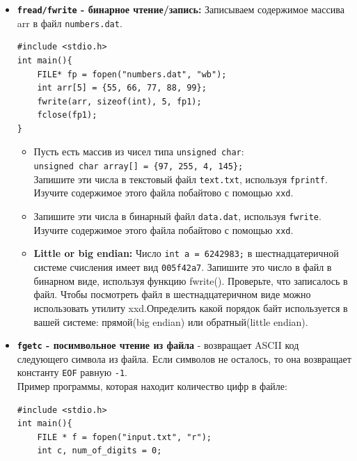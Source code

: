 \documentclass{article}
\begin{document}
\begin{itemize}
\item \textbf{\texttt{fread/fwrite} - бинарное чтение/запись:} Записываем содержимое массива arr в файл \texttt{numbers.dat}.
\begin{lstlisting}
#include <stdio.h>
int main(){
    FILE* fp = fopen("numbers.dat", "wb");
    int arr[5] = {55, 66, 77, 88, 99};
    fwrite(arr, sizeof(int), 5, fp1);
    fclose(fp1);
}
\end{lstlisting}
\begin{itemize}
\item Пусть есть массив из чисел типа \texttt{unsigned char}: \\
\texttt{unsigned char array[] = \{97, 255, 4, 145\};}\\
Запишите эти числа в текстовый файл \texttt{text.txt}, используя \texttt{fprintf}. Изучите содержимое этого файла побайтово с помощью \texttt{xxd}.
\item Запишите эти числа в бинарный файл \texttt{data.dat}, используя \texttt{fwrite}. Изучите содержимое этого файла побайтово с помощью \texttt{xxd}.
\item \textbf{Little or big endian:} Число \texttt{int a = 6242983;} в шестнадцатеричной системе счисления имеет вид \texttt{005f42a7}. Запишите это число в файл в бинарном виде, используя функцию fwrite(). Проверьте, что записалось в файл. Чтобы посмотреть файл в шестнадцатеричном виде можно использовать утилиту xxd.Определить какой порядок байт используется в вашей системе: прямой(big endian) или обратный(little endian).
\end{itemize}

\newpage
\item \textbf{\texttt{fgetc} - посимвольное чтение из файла} - возвращает ASCII код следующего символа из файла. Если символов не осталось, то она возвращает константу \texttt{EOF} равную \texttt{-1}.\\
Пример программы, которая находит количество цифр в файле:
\begin{lstlisting}
#include <stdio.h>
int main(){
    FILE * f = fopen("input.txt", "r");
    int c, num_of_digits = 0;


\end{lstlisting}
\end{itemize}
\end{document}
